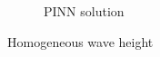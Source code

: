 \begin{frame}
\begin{figure}
\begin{subfigure}[b]{0.45\textwidth}
            \caption{PINN solution}
            \label{fig:10_homogeneous_pinn_swe_height}
        \end{subfigure}
        \caption{Homogeneous wave height}
        \label{fig:10_homogeneous_results}
    \end{figure}
\end{frame}